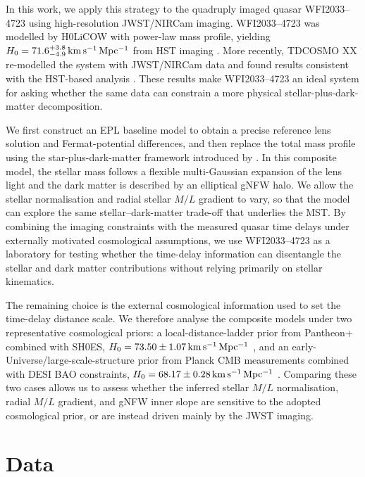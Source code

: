\documentclass[fleqn,usenatbib]{mnras}
\begin{document}
In this work, we apply this strategy to the quadruply imaged quasar WFI2033--4723 using high-resolution JWST/NIRCam imaging. WFI2033--4723 was modelled by H0LiCOW with power-law mass profile, yielding \(H_0=71.6^{+3.8}_{-4.9}\,{\rm km\,s^{-1}\,Mpc^{-1}}\) from HST imaging \citep{rusu2020}. More recently, TDCOSMO XX re-modelled the system with JWST/NIRCam data and found results consistent with the HST-based analysis \citep{Williams2025TDCOSMOXX}. These results make WFI2033--4723 an ideal system for asking whether the same data can constrain a more physical stellar-plus-dark-matter decomposition. 

We first construct an EPL baseline model to obtain a precise reference lens solution and Fermat-potential differences, and then replace the total mass profile using the star-plus-dark-matter framework introduced by \citet{Tian2026}. In this composite model, the stellar mass follows a flexible multi-Gaussian expansion of the lens light and the dark matter is described by an elliptical gNFW halo. We allow the stellar normalisation and radial stellar \(M/L\) gradient to vary, so that the model can explore the same stellar--dark-matter trade-off that underlies the MST. By combining the imaging constraints with the measured quasar time delays under externally motivated cosmological assumptions, we use WFI2033--4723 as a laboratory for testing whether the time-delay information can disentangle the stellar and dark matter contributions without relying primarily on stellar kinematics.

The remaining choice is the external cosmological information used to set the time-delay distance scale. We therefore analyse the composite models under two representative cosmological priors: a local-distance-ladder prior from Pantheon+ combined with SH0ES, \(H_0=73.50\pm1.07\,{\rm km\,s^{-1}\,Mpc^{-1}}\) \citep{Brout2022PantheonPlus,Riess2022SH0ES}, and an early-Universe/large-scale-structure prior from Planck CMB measurements combined with DESI BAO constraints, \(H_0=68.17\pm0.28\,{\rm km\,s^{-1}\,Mpc^{-1}}\) \citep{Planck2018,DESI2025BAO}. Comparing these two cases allows us to assess whether the inferred stellar \(M/L\) normalisation, radial \(M/L\) gradient, and gNFW inner slope are sensitive to the adopted cosmological prior, or are instead driven mainly by the JWST imaging.

\section{Data}
\label{sec:data}
\end{document}
